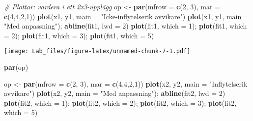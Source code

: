 \documentclass[
  11pt,
]{article}
\newenvironment{Shaded}{\begin{snugshade}}{\end{snugshade}}
\newcommand{\AttributeTok}[1]{\textcolor[rgb]{0.13,0.29,0.53}{#1}}
\newcommand{\CommentTok}[1]{\textcolor[rgb]{0.56,0.35,0.01}{\textit{#1}}}
\newcommand{\DecValTok}[1]{\textcolor[rgb]{0.00,0.00,0.81}{#1}}
\newcommand{\FunctionTok}[1]{\textcolor[rgb]{0.13,0.29,0.53}{\textbf{#1}}}
\newcommand{\NormalTok}[1]{#1}
\newcommand{\OtherTok}[1]{\textcolor[rgb]{0.56,0.35,0.01}{#1}}
\newcommand{\StringTok}[1]{\textcolor[rgb]{0.31,0.60,0.02}{#1}}
\begin{document}
\begin{Shaded}
\begin{Highlighting}[]
\CommentTok{\# Plottar: vardera i ett 2x3{-}upplägg}
\NormalTok{op }\OtherTok{\textless{}{-}} \FunctionTok{par}\NormalTok{(}\AttributeTok{mfrow =} \FunctionTok{c}\NormalTok{(}\DecValTok{2}\NormalTok{, }\DecValTok{3}\NormalTok{), }\AttributeTok{mar =} \FunctionTok{c}\NormalTok{(}\DecValTok{4}\NormalTok{,}\DecValTok{4}\NormalTok{,}\DecValTok{2}\NormalTok{,}\DecValTok{1}\NormalTok{))}
\FunctionTok{plot}\NormalTok{(x1, y1, }\AttributeTok{main =} \StringTok{"Icke{-}inflytelserik avvikare"}\NormalTok{)}
\FunctionTok{plot}\NormalTok{(x1, y1, }\AttributeTok{main =} \StringTok{"Med anpassning"}\NormalTok{); }\FunctionTok{abline}\NormalTok{(fit1, }\AttributeTok{lwd =} \DecValTok{2}\NormalTok{)}
\FunctionTok{plot}\NormalTok{(fit1, }\AttributeTok{which =} \DecValTok{1}\NormalTok{); }\FunctionTok{plot}\NormalTok{(fit1, }\AttributeTok{which =} \DecValTok{2}\NormalTok{); }\FunctionTok{plot}\NormalTok{(fit1, }\AttributeTok{which =} \DecValTok{3}\NormalTok{); }\FunctionTok{plot}\NormalTok{(fit1, }\AttributeTok{which =} \DecValTok{5}\NormalTok{)}
\end{Highlighting}
\end{Shaded}

\texttt{[image: Lab\_files/figure-latex/unnamed-chunk-7-1.pdf]}

\begin{Shaded}
\begin{Highlighting}[]
\FunctionTok{par}\NormalTok{(op)}

\NormalTok{op }\OtherTok{\textless{}{-}} \FunctionTok{par}\NormalTok{(}\AttributeTok{mfrow =} \FunctionTok{c}\NormalTok{(}\DecValTok{2}\NormalTok{, }\DecValTok{3}\NormalTok{), }\AttributeTok{mar =} \FunctionTok{c}\NormalTok{(}\DecValTok{4}\NormalTok{,}\DecValTok{4}\NormalTok{,}\DecValTok{2}\NormalTok{,}\DecValTok{1}\NormalTok{))}
\FunctionTok{plot}\NormalTok{(x2, y2, }\AttributeTok{main =} \StringTok{"Inflytelserik avvikare"}\NormalTok{)}
\FunctionTok{plot}\NormalTok{(x2, y2, }\AttributeTok{main =} \StringTok{"Med anpassning"}\NormalTok{); }\FunctionTok{abline}\NormalTok{(fit2, }\AttributeTok{lwd =} \DecValTok{2}\NormalTok{)}
\FunctionTok{plot}\NormalTok{(fit2, }\AttributeTok{which =} \DecValTok{1}\NormalTok{); }\FunctionTok{plot}\NormalTok{(fit2, }\AttributeTok{which =} \DecValTok{2}\NormalTok{); }\FunctionTok{plot}\NormalTok{(fit2, }\AttributeTok{which =} \DecValTok{3}\NormalTok{); }\FunctionTok{plot}\NormalTok{(fit2, }\AttributeTok{which =} \DecValTok{5}\NormalTok{)}
\end{Highlighting}
\end{Shaded}
\end{document}
